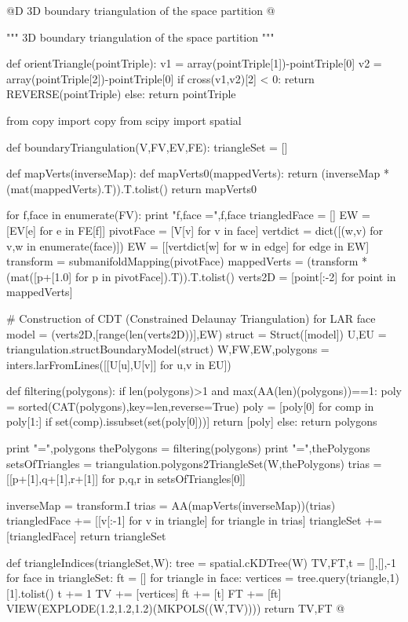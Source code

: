 \documentclass[11pt,oneside]{article}    %
\begin{document}
@D 3D boundary triangulation of the space partition 
@{""" 3D boundary triangulation of the space partition """

def orientTriangle(pointTriple):
    v1 = array(pointTriple[1])-pointTriple[0]
    v2 = array(pointTriple[2])-pointTriple[0]
    if cross(v1,v2)[2] < 0: return REVERSE(pointTriple)
    else: return pointTriple
    
from copy import copy
from scipy import spatial

def boundaryTriangulation(V,FV,EV,FE):
    triangleSet = []  
        
    def mapVerts(inverseMap):
        def mapVerts0(mappedVerts):
            return (inverseMap * (mat(mappedVerts).T)).T.tolist()
        return mapVerts0
        
    for f,face in enumerate(FV):
        print "f,face =",f,face
        triangledFace = []
        EW = [EV[e] for e in FE[f]]
        pivotFace = [V[v] for v in face]
        vertdict = dict([(w,v) for v,w in enumerate(face)])
        EW = [[vertdict[w] for w in edge] for edge in EW]
        transform = submanifoldMapping(pivotFace)
        mappedVerts = (transform * (mat([p+[1.0] for p in pivotFace]).T)).T.tolist()
        verts2D = [point[:-2] for point in mappedVerts] 
              
        # Construction of CDT (Constrained Delaunay Triangulation) for LAR face
        model = (verts2D,[range(len(verts2D))],EW)
        struct = Struct([model])
        U,EU = triangulation.structBoundaryModel(struct)
        W,FW,EW,polygons = inters.larFromLines([[U[u],U[v]] for u,v in EU])

        def filtering(polygons):
            if len(polygons)>1 and max(AA(len)(polygons))==1:
                poly = sorted(CAT(polygons),key=len,reverse=True)
                poly = [poly[0] for comp in poly[1:] if set(comp).issubset(set(poly[0]))]
                return [poly]
            else: return polygons

        print "\npolygons =",polygons
        thePolygons = filtering(polygons)
        print "\nthePolygons =",thePolygons
        setsOfTriangles = triangulation.polygons2TriangleSet(W,thePolygons)
        trias = [[p+[1],q+[1],r+[1]] for p,q,r in setsOfTriangles[0]]
        
        inverseMap = transform.I
        trias = AA(mapVerts(inverseMap))(trias)
        triangledFace += [[v[:-1] for v in triangle] for triangle in trias]
        triangleSet += [triangledFace]
    return triangleSet

def triangleIndices(triangleSet,W):
    tree = spatial.cKDTree(W)
    TV,FT,t = [],[],-1
    for face in triangleSet:
        ft = []
        for triangle in face:
            vertices = tree.query(triangle,1)[1].tolist()
            t += 1
            TV += [vertices]
            ft += [t]
        FT += [ft]
    VIEW(EXPLODE(1.2,1.2,1.2)(MKPOLS((W,TV))))
    return TV,FT
@}
\end{document}
